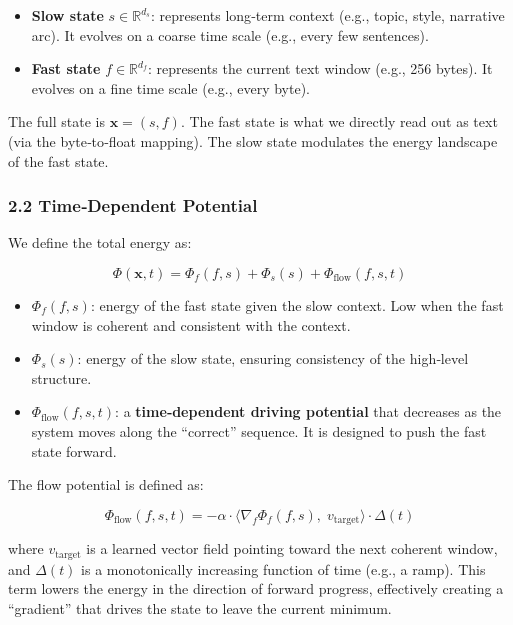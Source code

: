 \documentclass[
  11pt,
  a4paper,
]{article}
\providecommand{\tightlist}{%
  \setlength{\itemsep}{0pt}\setlength{\parskip}{0pt}}
\begin{document}
\begin{itemize}
\tightlist
\item
  \textbf{Slow state} \(s \in \mathbb{R}^{d_s}\): represents long‑term
  context (e.g., topic, style, narrative arc). It evolves on a coarse
  time scale (e.g., every few sentences).
\item
  \textbf{Fast state} \(f \in \mathbb{R}^{d_f}\): represents the current
  text window (e.g., 256 bytes). It evolves on a fine time scale (e.g.,
  every byte).
\end{itemize}

The full state is \(\mathbf{x} = (s, f)\). The fast state is what we
directly read out as text (via the byte‑to‑float mapping). The slow
state modulates the energy landscape of the fast state.

\subsubsection{2.2 Time‑Dependent
Potential}\label{timedependent-potential}

We define the total energy as:

\[
\Phi(\mathbf{x}, t) = \Phi_f(f, s) + \Phi_s(s) + \Phi_{\text{flow}}(f, s, t)
\]

\begin{itemize}
\tightlist
\item
  \(\Phi_f(f, s)\): energy of the fast state given the slow context. Low
  when the fast window is coherent and consistent with the context.
\item
  \(\Phi_s(s)\): energy of the slow state, ensuring consistency of the
  high‑level structure.
\item
  \(\Phi_{\text{flow}}(f, s, t)\): a \textbf{time‑dependent driving
  potential} that decreases as the system moves along the ``correct''
  sequence. It is designed to push the fast state forward.
\end{itemize}

The flow potential is defined as:

\[
\Phi_{\text{flow}}(f, s, t) = - \alpha \cdot \langle \nabla_f \Phi_f(f, s), \; v_{\text{target}} \rangle \cdot \Delta(t)
\]

where \(v_{\text{target}}\) is a learned vector field pointing toward
the next coherent window, and \(\Delta(t)\) is a monotonically
increasing function of time (e.g., a ramp). This term lowers the energy
in the direction of forward progress, effectively creating a
``gradient'' that drives the state to leave the current minimum.
\end{document}
